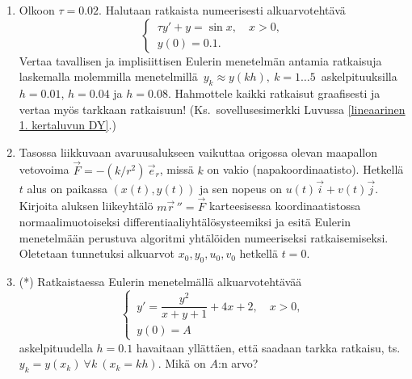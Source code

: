 \begin{enumerate}
\item \label{H-dy-7: kankea DY}
Olkoon $\tau = 0.02$. Halutaan ratkaista numeerisesti alkuarvotehtävä
\[
\begin{cases} \,\tau y'+y=\sin x, \quad x>0, \\ \,y(0)=0.1. \end{cases}
\]
Vertaa tavallisen ja implisiittisen Eulerin menetelmän antamia ratkaisuja laskemalla molemmilla
menetelmillä $\,y_k \approx y(kh),\ k=1 \ldots 5\,$ askelpituuksilla $h=0.01$, $h=0.04$ ja 
$h=0.08$. Hahmottele kaikki ratkaisut graafisesti ja vertaa myös tarkkaan ratkaisuun! 
(Ks.\ sovellusesimerkki Luvussa \ref{lineaarinen 1. kertaluvun DY}.)

\item
Tasossa liikkuvaan avaruusalukseen vaikuttaa origossa olevan maapallon vetovoima
$\vec F=-(k/r^2)\,\vec e_r$, missä $k$ on vakio (napakoordinaatisto). Hetkellä $t$ alus on 
paikassa $(x(t),y(t))$ ja sen nopeus on $u(t)\vec i+v(t)\vec j$. Kirjoita aluksen liikeyhtälö
$m\vec r\,''=\vec F$ karteesisessa koordinaatistossa normaalimuotoiseksi
differentiaaliyhtälösysteemiksi ja esitä Eulerin menetelmään perustuva algoritmi yhtälöiden
numeeriseksi ratkaisemiseksi. Oletetaan tunnetuksi alkuarvot $x_0,y_0,u_0,v_0$ hetkellä $t=0$.

\item (*)
Ratkaistaessa Eulerin menetelmällä alkuarvotehtävää
\[
\begin{cases} \,y'=\dfrac{y^2}{x+y+1}+4x+2, \quad x>0, \\[3mm] \,y(0)=A \end{cases}
\]
askelpituudella $h=0.1$ havaitaan yllättäen, että saadaan tarkka ratkaisu, ts.\
$y_k=y(x_k)\ \forall k\ (x_k=kh)$. Mikä on $A$:n arvo?

\end{enumerate}